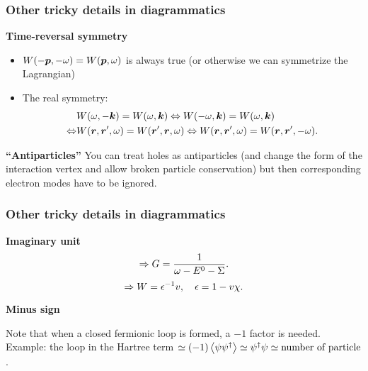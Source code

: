 \documentclass[t]{beamer}
\begin{document}
\begin{frame}
\frametitle{Other tricky details in diagrammatics}

\textbf{Time-reversal symmetry}

\begin{itemize}
    \item $W(- \vb*{p} , -\omega) = W(\vb*{p}, \omega)$ is always true 
        (or otherwise we can symmetrize the Lagrangian)
    \item The real symmetry: 
    \begin{equation}
        \begin{aligned}
            &W(\omega, -\vb*{k}) = W(\omega, \vb*{k}) \Leftrightarrow 
            W(- \omega, \vb*{k}) = W(\omega, \vb*{k})  \\
            \Leftrightarrow &W(\vb*{r}, \vb*{r}', \omega) = W(\vb*{r}', \vb*{r}, \omega) \Leftrightarrow
            W(\vb*{r}, \vb*{r}', \omega) = W(\vb*{r}, \vb*{r}', - \omega).
        \end{aligned}
    \end{equation}
\end{itemize}

\textbf{``Antiparticles''} You can treat holes as antiparticles 
(and change the form of the interaction vertex 
and allow broken particle conservation)
but then corresponding electron modes have to be ignored. 

\end{frame}

\begin{frame}
\frametitle{Other tricky details in diagrammatics}

\textbf{Imaginary unit} 
\begin{equation}
    \protect
    \Rightarrow G = \frac{1}{\omega - E^0 - \Sigma}.
\end{equation}    
\begin{equation}
    \protect
    \Rightarrow W = \epsilon^{-1} v, \quad \epsilon = 1 - v \chi.
\end{equation}

\textbf{Minus sign} 

Note that when a closed fermionic loop is formed, 
a $-1$ factor is needed. Example: the loop in the Hartree term
$\simeq (-1) \expval{\psi \psi^\dagger} \simeq \psi^\dagger \psi \simeq \text{number of particle}$.

\end{frame}
\end{document}
